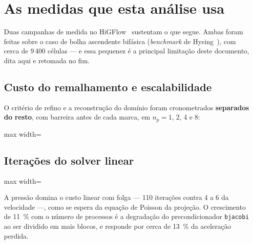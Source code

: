 \section{As medidas que esta an\'alise usa}
\label{sec:fase0}

Duas campanhas de medida no HiGFlow~\cite{sousa2019} sustentam o que segue. Ambas foram feitas
sobre o caso de bolha ascendente bif\'asica (\emph{benchmark} de Hysing~\cite{hysing2009}), com
cerca de 9\,400 c\'elulas --- e essa pequenez \'e a principal limita\c{c}\~ao
deste documento, dita aqui e retomada no fim.

\subsection{Custo do remalhamento e escalabilidade}

O crit\'erio de refino e a reconstru\c{c}\~ao do dom\'inio foram cronometrados
\textbf{separados do resto}, com barreira antes de cada marca, em
$n_p = 1$, 2, 4 e 8:

{\small
\begin{adjustbox}{max width=\linewidth}
\end{adjustbox}
}

\subsection{Itera\c{c}\~oes do solver linear}

\begin{adjustbox}{max width=\linewidth}
\end{adjustbox}

A press\~ao domina o custo linear com folga --- 110 itera\c{c}\~oes contra 4 a 6
da velocidade ---, como se espera da equa\c{c}\~ao de Poisson da proje\c{c}\~ao.
O crescimento de \SI{11}{\percent} com o n\'umero de processos \'e a
degrada\c{c}\~ao do precondicionador \texttt{bjacobi} ao ser dividido em mais
blocos, e responde por cerca de \SI{13}{\percent} da acelera\c{c}\~ao perdida.

